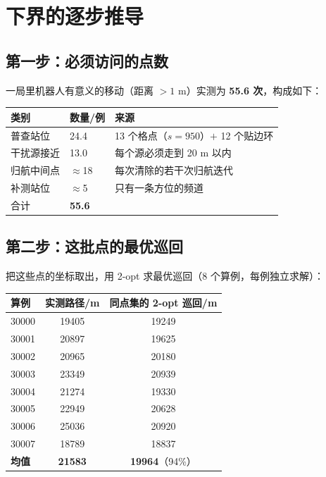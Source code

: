 \tableofcontents
\newpage

\section{下界的逐步推导}

\subsection{第一步：必须访问的点数}

一局里机器人有意义的移动（距离 $>1$ m）实测为 \textbf{55.6 次}，构成如下：

\begin{center}
\begin{tabular}{lll}
\toprule
类别 & 数量/例 & 来源 \\ \midrule
普查站位 & 24.4 & 13 个格点（$s=950$）$+$ 12 个贴边环 \\
干扰源接近 & 13.0 & 每个源必须走到 20 m 以内 \\
归航中间点 & $\approx$18 & 每次清除的若干次归航迭代 \\
补测站位 & $\approx$5 & 只有一条方位的频道 \\
\midrule
合计 & \textbf{55.6} & \\
\bottomrule
\end{tabular}
\end{center}

\subsection{第二步：这批点的最优巡回}

把这些点的坐标取出，用 2-opt 求最优巡回（8 个算例，每例独立求解）：

\begin{center}
\begin{tabular}{lcc}
\toprule
算例 & 实测路径/m & 同点集的 2-opt 巡回/m \\ \midrule
30000 & 19405 & 19249 \\
30001 & 20897 & 19625 \\
30002 & 20965 & 20180 \\
30003 & 23349 & 20939 \\
30004 & 21274 & 19330 \\
30005 & 22949 & 20628 \\
30006 & 25036 & 20920 \\
30007 & 18789 & 18837 \\
\midrule
\textbf{均值} & \textbf{21583} & \textbf{19964}（94\%） \\
\bottomrule
\end{tabular}
\end{center}

